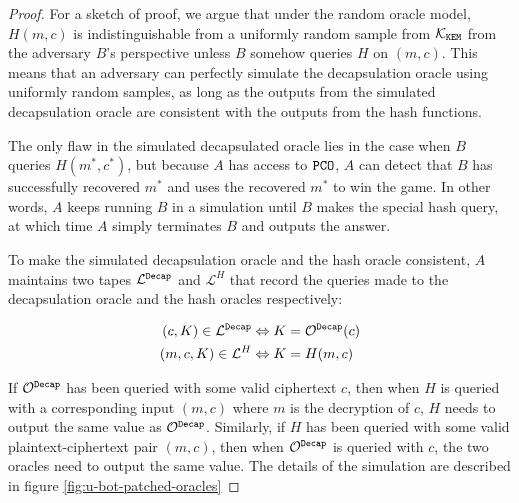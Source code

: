 \documentclass{article}
\begin{document}
\begin{proof}
    For a sketch of proof, we argue that under the random oracle model, $H(m, c)$ is indistinguishable from a uniformly random sample from $\mathcal{K}_\texttt{KEM}$ from the adversary $B$'s perspective unless $B$ somehow queries $H$ on $(m, c)$. This means that an  adversary can perfectly simulate the decapsulation oracle using uniformly random samples, as long as the outputs from the simulated decapsulation oracle are consistent with the outputs from the hash functions.

    The only flaw in the simulated decapsulated oracle lies in the case when $B$ queries $H(m^\ast, c^\ast)$, but because $A$ has access to $\texttt{PCO}$, $A$ can detect that $B$ has successfully recovered $m^\ast$ and uses the recovered $m^\ast$ to win the  game. In other words, $A$ keeps running $B$ in a simulation until $B$ makes the special hash query, at which time $A$ simply terminates $B$ and outputs the answer.

    To make the simulated decapsulation oracle and the hash oracle consistent, $A$ maintains two tapes $\mathcal{L}^\texttt{Decap}$ and $\mathcal{L}^H$ that record the queries made to the decapsulation oracle and the hash oracles respectively: 
    
    $$
    \begin{aligned}
        (c, K) \in \mathcal{L}^\texttt{Decap} &\Leftrightarrow K = \mathcal{O}^\texttt{Decap}(c) \\
        (m, c, K) \in \mathcal{L}^H &\Leftrightarrow K = H(m, c)
    \end{aligned}
    $$

    If $\mathcal{O}^\texttt{Decap}$ has been queried with some valid ciphertext $c$, then when $H$ is queried with a corresponding input $(m, c)$ where $m$ is the decryption of $c$, $H$ needs to output the same value as $\mathcal{O}^\texttt{Decap}$. Similarly, if $H$ has been queried with some valid plaintext-ciphertext pair $(m, c)$, then when $\mathcal{O}^\texttt{Decap}$ is queried with $c$, the two oracles need to output the same value. The details of the simulation are described in figure \ref{fig:u-bot-patched-oracles}


\end{proof}
\end{document}
